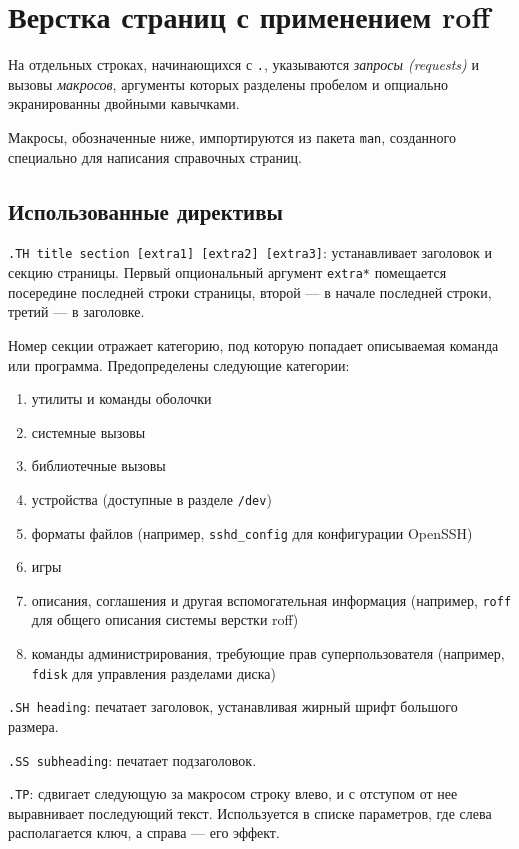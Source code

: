 \documentclass[listings]{labreport}
\begin{document}
\maketitlepage

\section*{Верстка страниц с применением roff}

На отдельных строках, начинающихся с \texttt{.}, указываются \textit{запросы (requests)} и
вызовы \textit{макросов}, аргументы которых разделены пробелом и опциально экранированны
двойными кавычками.

Макросы, обозначенные ниже, импортируются из пакета \texttt{man}, созданного специально
для написания справочных страниц.

\subsection*{Использованные директивы}

\texttt{.TH title section [extra1] [extra2] [extra3]}: устанавливает заголовок и секцию страницы.
Первый опциональный аргумент \texttt{extra*} помещается посередине последней строки страницы,
второй — в начале последней строки, третий — в заголовке.

Номер секции отражает категорию, под которую попадает описываемая команда или программа. Предопределены
следующие категории:

\begin{enumerate}
\item утилиты и команды оболочки
\item системные вызовы
\item библиотечные вызовы
\item устройства (доступные в разделе \texttt{/dev})
\item форматы файлов (например, \texttt{sshd\_config} для конфигурации OpenSSH)
\item игры
\item описания, соглашения и другая вспомогательная информация (например, \texttt{roff} для общего описания системы верстки roff)
\item команды администрирования, требующие прав суперпользователя (например, \texttt{fdisk} для управления разделами диска)
\end{enumerate}

\texttt{.SH heading}: печатает заголовок, устанавливая жирный шрифт большого размера.

\texttt{.SS subheading}: печатает подзаголовок.

\texttt{.TP}: сдвигает следующую за макросом строку влево, и с отступом от нее выравнивает последующий текст.
Используется в списке параметров, где слева располагается ключ, а справа — его эффект.
\end{document}
